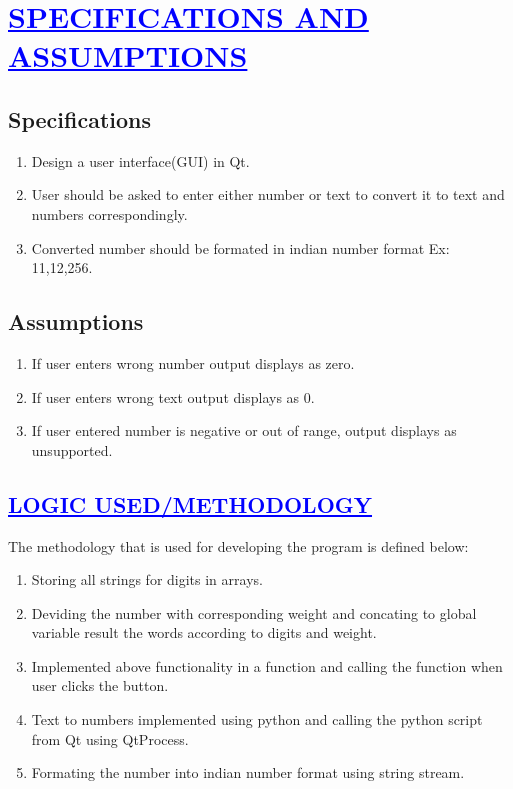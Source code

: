 \documentclass[a4paper,12pt]{report}
\begin{document}
\begin{center}
\chapter{\textcolor{blue}{\underline {SPECIFICATIONS AND ASSUMPTIONS}}}

\section*{Specifications}

\begin{enumerate}
\item Design a user interface(GUI) in Qt.
\item User should be asked to enter either number or text to convert it to text and numbers correspondingly.
\item Converted number should be formated in indian number format Ex: 11,12,256.
\end{enumerate}

\section*{Assumptions}

\begin{enumerate}
\item If user enters wrong number output displays as zero.
\item If user enters wrong text output displays as 0.
\item If user entered number is negative or out of range, output displays as unsupported.
\end{enumerate}
 
\begin{center}
\chapter{\textcolor{blue}{\underline {LOGIC USED/METHODOLOGY}}}
\end{center}
The methodology that is used for developing the program is defined below:\\
\begin{center}
\begin{enumerate}
\item Storing all strings for digits in arrays.
\item Deviding the number with corresponding weight and concating to global variable result the words according to digits and weight.
\item Implemented above functionality in a function and calling the function when user clicks the button.
\item Text to numbers implemented using python and calling the python script from Qt using QtProcess.
\item Formating the number into indian number format using string stream.
\end{enumerate}
\end{center}


\end{center}
\end{document}
